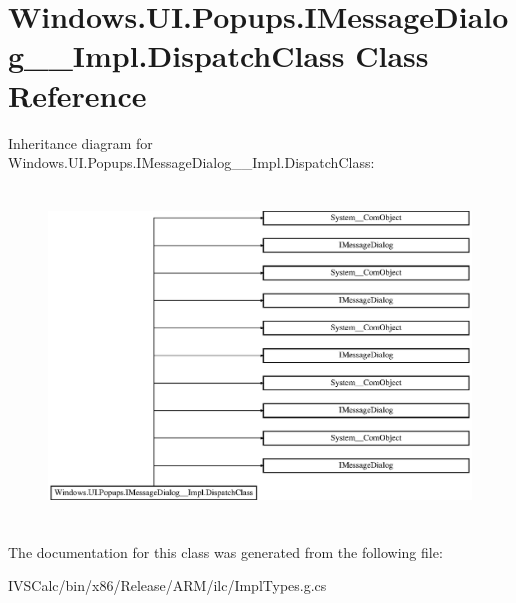\hypertarget{class_windows_1_1_u_i_1_1_popups_1_1_i_message_dialog_____impl_1_1_dispatch_class}{}\section{Windows.\+U\+I.\+Popups.\+I\+Message\+Dialog\+\_\+\+\_\+\+Impl.\+Dispatch\+Class Class Reference}
\label{class_windows_1_1_u_i_1_1_popups_1_1_i_message_dialog_____impl_1_1_dispatch_class}
Inheritance diagram for Windows.\+U\+I.\+Popups.\+I\+Message\+Dialog\+\_\+\+\_\+\+Impl.\+Dispatch\+Class\+:\begin{figure}[H]
\begin{center}
\leavevmode
\includegraphics[height=8.927536cm]{class_windows_1_1_u_i_1_1_popups_1_1_i_message_dialog_____impl_1_1_dispatch_class}
\end{center}
\end{figure}


The documentation for this class was generated from the following file\+:\begin{DoxyCompactItemize}
\item 
I\+V\+S\+Calc/bin/x86/\+Release/\+A\+R\+M/ilc/Impl\+Types.\+g.\+cs\end{DoxyCompactItemize}
